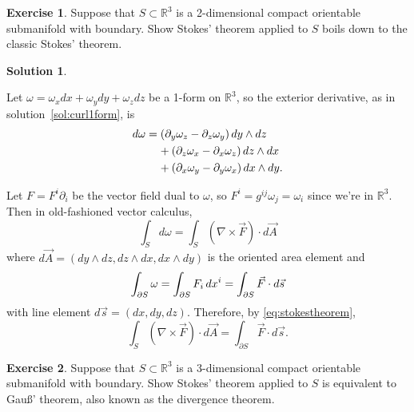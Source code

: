 \documentclass[11pt, a4paper]{report}
\theoremstyle{definition}
\newtheorem{exercise}{Exercise}[part]
\newtheorem{solution}{Solution}[part]
\newenvironment{ex}{\begin{exercise}}{\end{exercise}\pagebreak[1]}
\newenvironment{sol}{\begin{solution}}{\end{solution}\pagebreak[3]}
\newcommand*{\pheq}{\ensuremath\mathrel{\phantom{=}}\negmedspace{}}
\renewcommand*{\d}{\ensuremath\mathop{}\mathopen{}d}
\renewcommand*{\star}{\ensuremath\mathop{}\mathopen\binstar\mathord{}}
\begin{document}
\begin{ex}

Suppose that $S \subset \mathbb{R}^3$ is a 2-dimensional compact orientable submanifold with boundary.
Show Stokes' theorem applied to $S$ boils down to the classic Stokes' theorem.

\end{ex}

\begin{sol}\label{sol:classicstokestheorem}

Let $\omega = \omega_x dx + \omega_y dy + \omega_z dz$ be a 1-form on $\mathbb{R}^3$, so the exterior derivative, as in solution~\ref{sol:curl1form}, is
\begin{align*}
    d\omega &= (\partial_y \omega_z - \partial_z \omega_y) \d y \wedge dz \\
        &\pheq + (\partial_z \omega_x - \partial_x \omega_z) \d z \wedge dx \\
        &\pheq + (\partial_x \omega_y - \partial_y \omega_x) \d x \wedge dy.
\end{align*}


Let $F = F^i \partial_i$ be the vector field dual to $\omega$, so $F^i = g^{ij} \omega_j = \omega_i$ since we're in $\mathbb{R}^3$. Then in old-fashioned vector calculus,
\[
    \int_S d\omega = \int_S (\nabla \times \vec{F}) \cdot d\vec{A}
\]
where $d\vec{A} = (dy \wedge dz, dz \wedge dx, dx \wedge dy)$ is the oriented area element
and
\[
    \int_{\partial S} \omega = \int_{\partial S} F_i \d x^i
                             = \int_{\partial S} \vec{F} \cdot d\vec{s}
\]
with line element $d\vec{s} = (dx, dy, dz)$.
Therefore, by \ref{eq:stokestheorem}, %
\[
    \int_S (\nabla \times \vec{F}) \cdot d\vec{A} = \int_{\partial S} \vec{F} \cdot d\vec{s}.
\]

\end{sol}

\begin{ex}

Suppose that $S \subset \mathbb{R}^3$ is a 3-dimensional compact orientable submanifold with boundary.
Show Stokes' theorem applied to $S$ is equivalent to Gau\ss' theorem, also known as the divergence theorem.

\end{ex}
\end{document}
